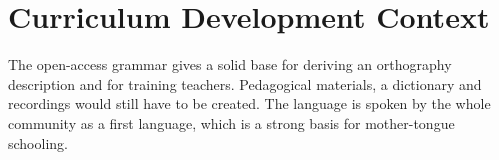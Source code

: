 \documentclass[12pt]{article}
\begin{document}
\section{Curriculum Development Context}
The open-access grammar gives a solid base for deriving an orthography description and for training teachers. Pedagogical materials, a dictionary and recordings would still have to be created. The language is spoken by the whole community as a first language, which is a strong basis for mother-tongue schooling.
\end{document}
